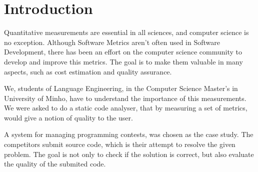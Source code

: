 \section{Introduction}

Quantitative measurements are essential in all sciences, and computer science is no exception. Although Software Metrics aren't often used in Software Development, there has been an effort on the computer science community to develop and improve this metrics. The goal is to make them valuable in many aspects, such as cost estimation and quality assurance.

We, students of Language Engineering, in the Computer Science Master's in University of Minho, have to understand the importance of this measurements. We were asked to do a static code analyser, that by measuring a set of metrics, would give a notion of quality to the user.

A system for managing programming contests, was chosen as the case study. The competitors submit source code, which is their attempt to resolve the given problem. The goal is not only to check if the solution is correct, but also evaluate the quality of the submited code.